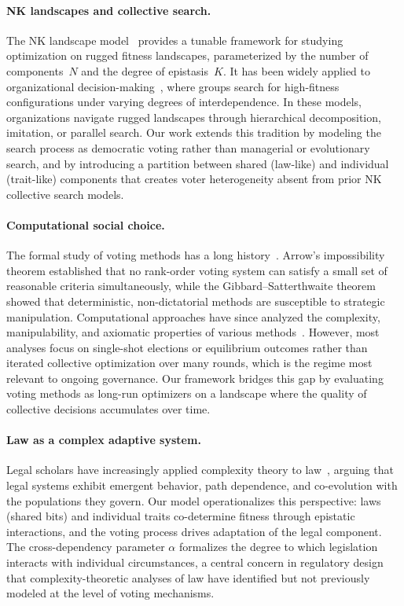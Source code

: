 
\paragraph{NK landscapes and collective search.}
The NK landscape model~\citep{kauffman1993origins} provides a tunable framework
for studying optimization on rugged fitness landscapes, parameterized by the
number of components~$N$ and the degree of epistasis~$K$. It has been widely
applied to organizational decision-making~\citep{levinthal1997adaptation,
rivkin2000imitation}, where groups search for high-fitness configurations under
varying degrees of interdependence. In these models, organizations navigate
rugged landscapes through hierarchical decomposition, imitation, or parallel
search. Our work extends this tradition by modeling the search process as
democratic voting rather than managerial or evolutionary search, and by
introducing a partition between shared (law-like) and individual (trait-like)
components that creates voter heterogeneity absent from prior NK collective
search models.

\paragraph{Computational social choice.}
The formal study of voting methods has a long
history~\citep{arrow1951social, gibbard1973manipulation, satterthwaite1975strategy}. Arrow's impossibility
theorem established that no rank-order voting system can satisfy a small set of
reasonable criteria simultaneously, while the Gibbard--Satterthwaite theorem
showed that deterministic, non-dictatorial methods are susceptible to strategic manipulation. Computational approaches have
since analyzed the complexity, manipulability, and axiomatic properties of
various methods~\citep{brandt2016handbook}. However, most analyses focus on
single-shot elections or equilibrium outcomes rather than iterated collective
optimization over many rounds, which is the regime most relevant to ongoing
governance. Our framework bridges this gap by evaluating voting methods as
long-run optimizers on a landscape where the quality of collective decisions
accumulates over time.

\paragraph{Law as a complex adaptive system.}
Legal scholars have increasingly applied complexity theory to
law~\citep{ruhl1996fitness, ruhl2008complexity}, arguing that legal systems
exhibit emergent behavior, path dependence, and co-evolution with the populations
they govern. Our model operationalizes this perspective: laws (shared bits) and
individual traits co-determine fitness through epistatic interactions, and the
voting process drives adaptation of the legal component. The cross-dependency
parameter $\alpha$ formalizes the degree to which legislation interacts with
individual circumstances, a central concern in regulatory design that
complexity-theoretic analyses of law have identified but not previously modeled
at the level of voting mechanisms.
